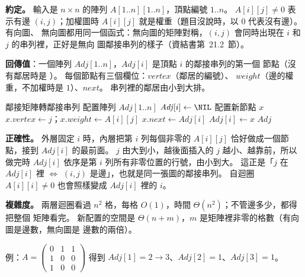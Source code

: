 \begin{pastsoln}
\textbf{約定。} 輸入是 $n \times n$ 的陣列 $A[1..n][1..n]$，頂點編號 $1..n$。 $A[i][j] \ne 0$
表示有邊 $(i, j)$；加權圖時 $A[i][j]$ 就是權重（題目沒說時，以 $0$ 代表沒有邊）。 有向圖、
無向圖都用同一個函式：無向圖的矩陣對稱，$(i, j)$ 會同時出現在 $i$ 和 $j$ 的串列裡，正好是無向
圖鄰接串列的樣子（資結書第~21.2~節）。

\textbf{回傳值}：一個陣列 $\mathit{Adj}[1..n]$，$\mathit{Adj}[i]$ 是頂點 $i$ 的鄰接串列的第一個
節點（沒有鄰居時是 \NIL）。 每個節點有三個欄位：$\mathit{vertex}$（鄰居的編號）、
$\mathit{weight}$（邊的權重，不加權時是 $1$）、$\mathit{next}$。 串列裡的鄰居由小到大排。

\begin{pseudo}{鄰接矩陣轉鄰接串列}
    \State 配置陣列 $\mathit{Adj}[1..n]$
        \State $\mathit{Adj}[i] \gets \NIL$
         
                \State 配置新節點 $x$
                \State $x.\mathit{vertex} \gets j$；$x.\mathit{weight} \gets A[i][j]$
                \State $x.\mathit{next} \gets \mathit{Adj}[i]$
                \State $\mathit{Adj}[i] \gets x$
            \EndIf
        \EndFor
    \EndFor
    \State \Return $\mathit{Adj}$
\EndFunction
\end{pseudo}

\textbf{正確性。} 外層固定 $i$ 時，內層把第 $i$ 列每個非零的 $A[i][j]$ 恰好做成一個節點，接到
$\mathit{Adj}[i]$ 的最前面。 $j$ 由大到小，越後面插入的 $j$ 越小、越靠前，所以做完時
$\mathit{Adj}[i]$ 依序是第 $i$ 列所有非零位置的行號，由小到大。 這正是「$j$ 在 $\mathit{Adj}[i]$
裡 $\iff$ $(i, j)$ 是邊」，也就是同一張圖的鄰接串列。 自迴圈 $A[i][i] \ne 0$ 也會照樣變成
$\mathit{Adj}[i]$ 裡的 $i$。

\textbf{複雜度。} 兩層迴圈看過 $n^2$ 格，每格 $O(1)$，時間 $\Theta(n^2)$；不管邊多少，都得把整個
矩陣看完。 新配置的空間是 $\Theta(n + m)$，$m$ 是矩陣裡非零的格數（有向圖是邊數，無向圖是
邊數的兩倍）。

例：$A = \begin{pmatrix} 0 & 1 & 1 \\ 1 & 0 & 0 \\ 1 & 0 & 0 \end{pmatrix}$ 得到
$\mathit{Adj}[1] = 2 \to 3$、$\mathit{Adj}[2] = 1$、$\mathit{Adj}[3] = 1$。
\end{pastsoln}

